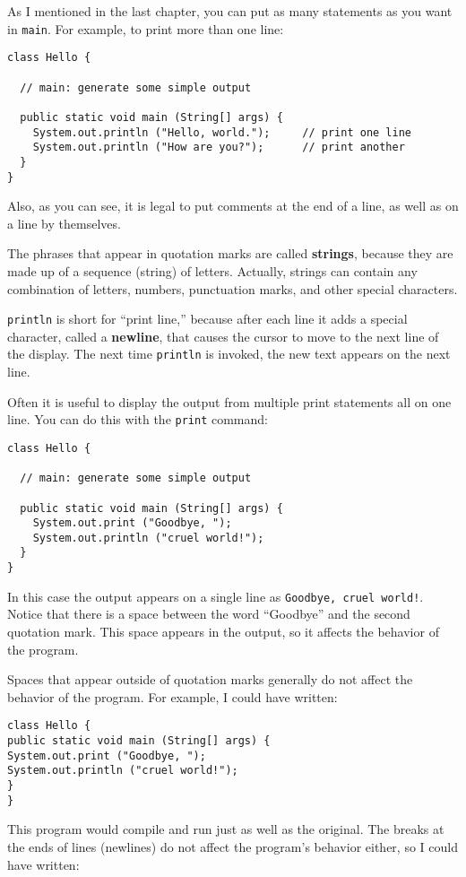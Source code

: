 \documentclass{book}
\begin{document}
As I mentioned in the last chapter, you can put as many
statements as you want in {\tt main}.  For example, to
print more than one line:

\begin{verbatim}
class Hello {

  // main: generate some simple output

  public static void main (String[] args) {
    System.out.println ("Hello, world.");     // print one line
    System.out.println ("How are you?");      // print another
  }
}
\end{verbatim}
%
Also, as you can see, it is legal to put comments at the
end of a line, as well as on a line by themselves.


The phrases that appear in quotation marks are called {\bf strings},
because they are made up of a sequence (string) of letters.  Actually,
strings can contain any combination of letters, numbers, punctuation
marks, and other special characters.


{\tt println} is short for ``print line,'' because after each
line it adds a special character, called a {\bf newline}, that
causes the cursor to move to the next line of the display.
The next time {\tt println} is invoked, the new text appears
on the next line.

Often it is useful to display the output from multiple print
statements all on one line.  You can do this with the {\tt print}
command:

\begin{verbatim}
class Hello {

  // main: generate some simple output

  public static void main (String[] args) {
    System.out.print ("Goodbye, ");
    System.out.println ("cruel world!");
  }
}
\end{verbatim}
%
In this case the output appears on a single line as
{\tt Goodbye, cruel world!}.  Notice that there is a space
between the word ``Goodbye'' and the second quotation mark.
This space appears in the output, so it affects the behavior
of the program.

Spaces that appear outside of quotation marks generally do
not affect the behavior of the program.  For example, I
could have written:

\begin{verbatim}
class Hello {
public static void main (String[] args) {
System.out.print ("Goodbye, ");
System.out.println ("cruel world!");
}
}
\end{verbatim}
%
This program would compile and run just as well as the original.
The breaks at the ends of lines (newlines) do not affect
the program's behavior either, so I could have written:
\end{document}
